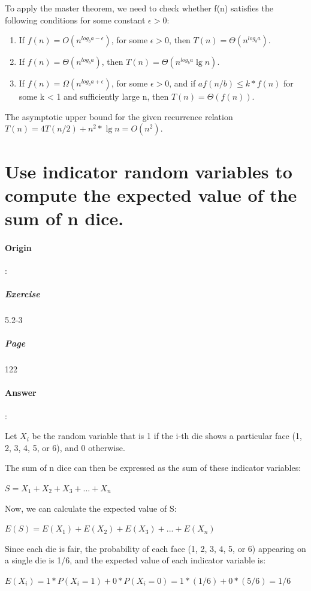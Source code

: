 \documentclass{article}
\begin{document}
  To apply the master theorem, we need to check whether f(n) satisfies the following conditions for some constant $\epsilon  > 0$:

  \begin{enumerate}
    \item If $ f(n) = O(n^{log_{b} a - \epsilon } ) $, for some $\epsilon > 0$, then $T(n) = \Theta (n^{log_{b}a})$.
    \item If $ f(n) = \Theta(n^{log_{b}a}) $, then $ T(n) = \Theta(n^{log_{b} a}  \lg n) $.
    \item If $ f(n) = \Omega (n^{log_{b}a + \epsilon}) $, for some $\epsilon > 0$, and if $a f(n/b) \leq k * f(n)$ for some k < 1 and sufficiently large n, then $T(n) = \Theta(f(n))$.
  \end{enumerate}

  The asymptotic upper bound for the given recurrence relation $T(n) = 4T(n/2) + n^2 * \lg n = O(n^2)$.

  \section{Use indicator random variables to compute the expected value of the sum of n dice.}

  \paragraph{Origin}:
    \subparagraph{Exercise}5.2-3
    \subparagraph{Page}122
  \paragraph{Answer}:

Let $X_i$ be the random variable that is 1 if the i-th die shows a particular face (1, 2, 3, 4, 5, or 6), and 0 otherwise.

The sum of n dice can then be expressed as the sum of these indicator variables:

$ S = X_1 + X_2 + X_3 + ... + X_n $

Now, we can calculate the expected value of S:

$ E(S) = E(X_1) + E(X_2) + E(X_3) + ... + E(X_n) $

Since each die is fair, the probability of each face (1, 2, 3, 4, 5, or 6) appearing on a single die is 1/6, and the expected value of each indicator variable is:

$ E(X_i) = 1 * P(X_i = 1) + 0 * P(X_i = 0) = 1 * (1/6) + 0 * (5/6) = 1/6 $
\end{document}
